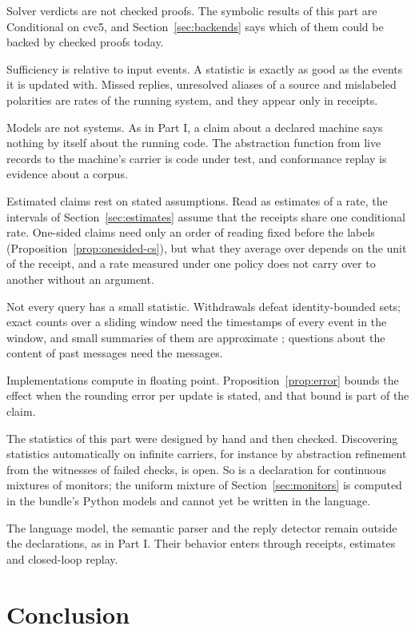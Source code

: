 \documentclass[11pt]{article}
\theoremstyle{definition}
\theoremstyle{plain}
\begin{document}
Solver verdicts are not checked proofs. The symbolic results of this part are Conditional on cvc5,
and Section~\ref{sec:backends} says which of them could be backed by checked proofs today.

Sufficiency is relative to input events. A statistic is exactly as good as the events it is updated
with. Missed replies, unresolved aliases of a source and mislabeled polarities are rates of the
running system, and they appear only in receipts.

Models are not systems. As in Part I, a claim about a declared machine says nothing by itself about
the running code. The abstraction function from live records to the machine's carrier is code under
test, and conformance replay is evidence about a corpus.

Estimated claims rest on stated assumptions. Read as estimates of a rate, the intervals of
Section~\ref{sec:estimates} assume that the receipts share one conditional rate. One-sided claims
need only an order of reading fixed before the labels (Proposition~\ref{prop:onesided-cs}), but what
they average over depends on the unit of the receipt, and a rate measured under one policy does not
carry over to another without an argument.

Not every query has a small statistic. Withdrawals defeat identity-bounded sets; exact counts over a
sliding window need the timestamps of every event in the window, and small summaries of them are
approximate \cite{datar}; questions about the content of past messages need the messages.

Implementations compute in floating point. Proposition~\ref{prop:error} bounds the effect when the
rounding error per update is stated, and that bound is part of the claim.

The statistics of this part were designed by hand and then checked. Discovering statistics
automatically on infinite carriers, for instance by abstraction refinement from the witnesses of
failed checks, is open. So is a declaration for continuous mixtures of monitors; the uniform mixture
of Section~\ref{sec:monitors} is computed in the bundle's Python models and cannot yet be written in
the language.

The language model, the semantic parser and the reply detector remain outside the declarations, as
in Part I. Their behavior enters through receipts, estimates and closed-loop replay.

\section{Conclusion}\label{sec:conclusion}
\end{document}
